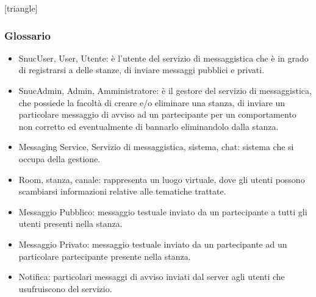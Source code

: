 \documentclass[t]{beamer} %
\let\olditem=\item%
\renewcommand{\item}{\olditem \justifying}%
\begin{document}
[triangle]
\begin{frame} [allowframebreaks]
  \frametitle{Glossario} 
   \begin{itemize} 
    \item SnucUser, User, Utente: è l'utente del servizio di messaggistica che è in grado di registrarsi a delle stanze, di inviare messaggi pubblici e privati.
    \item SnucAdmin, Admin, Amministratore: è il gestore del servizio di messaggistica, che possiede la facoltà di creare e/o eliminare una stanza, di inviare un 
          particolare messaggio di avviso ad un partecipante per un comportamento non corretto ed eventualmente di bannarlo eliminandolo dalla stanza.
    \item Messaging Service, Servizio di messaggistica, sistema, chat: sistema che si occupa della gestione.
    \item Room, stanza, canale: rappresenta un luogo virtuale, dove gli utenti possono scambiarsi informazioni relative alle tematiche trattate.
    \item Messaggio Pubblico: messaggio testuale inviato da un partecipante a tutti gli utenti presenti nella stanza.
    \item Messaggio Privato: messaggio testuale inviato da un partecipante ad un particolare partecipante presente nella stanza.
    \item Notifica: particolari messaggi di avviso inviati dal server agli utenti che usufruiscono del servizio.  
  \end{itemize}
\end{frame}
\end{document}
